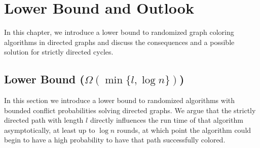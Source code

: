 \chapter{Lower Bound and Outlook}

In this chapter, we introduce a lower bound to randomized graph coloring algorithms in directed graphs and discuss the consequences and a possible solution for strictly directed cycles.

\section{Lower Bound ($\Omega (\min\{l, \log n\})$)}

In this section we introduce a lower bound to randomized algorithms with bounded conflict probabilities solving directed graphs. We argue that the strictly directed path with length $l$ directly influences the run time of that algorithm asymptotically, at least up to $\log n$ rounds, at which point the algorithm could begin to have a high probability to have that path successfully colored.

